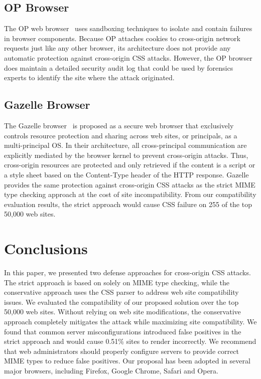 \documentclass{acm_proc_article-sp}
\begin{document}
\subsection{OP Browser}
The OP web browser~\cite{op-browser} uses sandboxing techniques to isolate and
contain failures in browser components. Because OP attaches cookies to
cross-origin network requests just like any other browser, its architecture
does not provide any automatic protection against cross-origin CSS attacks.
However, the OP browser does maintain a detailed security audit log that could
be used by forensics experts to identify the site where the attack originated.

\subsection{Gazelle Browser}
The Gazelle browser~\cite{gazelle} is proposed as a secure web browser that exclusively controls resource protection and sharing across web sites, or principals, as a multi-principal OS. In their architecture, all cross-principal communication are explicitly mediated by the browser kernel to prevent cross-origin attacks. Thus, cross-origin resources are protected and only retrieved if the content is a script or a style sheet based on the Content-Type header of the HTTP response. Gazelle provides the same protection against cross-origin CSS attacks as the strict MIME type checking approach at the cost of site incompatibility. From our compatibility evaluation results, the strict approach would cause CSS failure on 255 of the top 50,000 web sites.

\section{Conclusions} \label{sec:conclusion}
In this paper, we presented two defense approaches for cross-origin CSS attacks. The strict approach is based on solely on MIME type
checking, while the conservative approach uses the CSS parser to
address web site compatibility issues. We evaluated the compatibility of our
proposed solution over the top 50,000 web sites. Without relying on web site
modifications, the conservative approach completely mitigates the attack while
maximizing site compatibility. We found that common server misconfigurations
introduced false positives in the strict approach and would cause 0.51\%
sites to render incorrectly. We recommend that web administrators should
properly configure servers to provide correct MIME types to reduce false
positives. Our proposal has been adopted in several major browsers, including
Firefox, Google Chrome, Safari and Opera.
\end{document}

